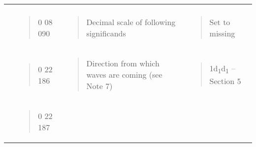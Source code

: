 \begin{longtable}[]{@{}llll@{}}
\begin{minipage}[t]{0.22\columnwidth}
\end{minipage}\tabularnewline
\begin{minipage}[t]{0.22\columnwidth}\raggedright
\strut
\end{minipage} & \begin{minipage}[t]{0.22\columnwidth}\raggedright
\begin{quote}
0 08 090
\end{quote}\strut
\end{minipage} & \begin{minipage}[t]{0.22\columnwidth}\raggedright
\begin{quote}
Decimal scale of following significands
\end{quote}\strut
\end{minipage} & \begin{minipage}[t]{0.22\columnwidth}\raggedright
\begin{quote}
Set to missing
\end{quote}\strut
\end{minipage}\tabularnewline
\begin{minipage}[t]{0.22\columnwidth}\raggedright
\strut
\end{minipage} & \begin{minipage}[t]{0.22\columnwidth}\raggedright
\begin{quote}
0 22 186
\end{quote}\strut
\end{minipage} & \begin{minipage}[t]{0.22\columnwidth}\raggedright
\begin{quote}
Direction from which waves are coming (see Note 7)
\end{quote}\strut
\end{minipage} & \begin{minipage}[t]{0.22\columnwidth}\raggedright
\begin{quote}
1d\textsubscript{1}d\textsubscript{1} -- Section 5
\end{quote}\strut
\end{minipage}\tabularnewline
\begin{minipage}[t]{0.22\columnwidth}\raggedright
\strut
\end{minipage} & \begin{minipage}[t]{0.22\columnwidth}\raggedright
\begin{quote}
0 22 187
\end{quote}\strut
\end{minipage} & \begin{minipage}[t]{0.22\columnwidth}\raggedright

\end{minipage}
\end{longtable}
